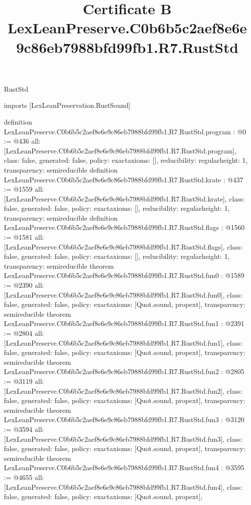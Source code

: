 \begin{lexlean}{RustStd}
\title{Certificate B LexLeanPreserve.C0b6b5c2aef8e6e9c86eb7988bfd99fb1.R7.RustStd}
\begin{coremodule}
imports [LexLeanPreservation.RustSound]

definition LexLeanPreserve.C0b6b5c2aef8e6e9c86eb7988bfd99fb1.R7.RustStd.program : @0 := @436 {
  all: [LexLeanPreserve.C0b6b5c2aef8e6e9c86eb7988bfd99fb1.R7.RustStd.program],
  class: false,
  generated: false,
  policy: exact{axioms: []},
  reducibility: regular{height: 1},
  transparency: semireducible
}
definition LexLeanPreserve.C0b6b5c2aef8e6e9c86eb7988bfd99fb1.R7.RustStd.krate : @437 := @1559 {
  all: [LexLeanPreserve.C0b6b5c2aef8e6e9c86eb7988bfd99fb1.R7.RustStd.krate],
  class: false,
  generated: false,
  policy: exact{axioms: []},
  reducibility: regular{height: 1},
  transparency: semireducible
}
definition LexLeanPreserve.C0b6b5c2aef8e6e9c86eb7988bfd99fb1.R7.RustStd.flags : @1560 := @1581 {
  all: [LexLeanPreserve.C0b6b5c2aef8e6e9c86eb7988bfd99fb1.R7.RustStd.flags],
  class: false,
  generated: false,
  policy: exact{axioms: []},
  reducibility: regular{height: 1},
  transparency: semireducible
}
theorem LexLeanPreserve.C0b6b5c2aef8e6e9c86eb7988bfd99fb1.R7.RustStd.fun0 : @1589 := @2390 {
  all: [LexLeanPreserve.C0b6b5c2aef8e6e9c86eb7988bfd99fb1.R7.RustStd.fun0],
  class: false,
  generated: false,
  policy: exact{axioms: [Quot.sound, propext]},
  transparency: semireducible
}
theorem LexLeanPreserve.C0b6b5c2aef8e6e9c86eb7988bfd99fb1.R7.RustStd.fun1 : @2391 := @2804 {
  all: [LexLeanPreserve.C0b6b5c2aef8e6e9c86eb7988bfd99fb1.R7.RustStd.fun1],
  class: false,
  generated: false,
  policy: exact{axioms: [Quot.sound, propext]},
  transparency: semireducible
}
theorem LexLeanPreserve.C0b6b5c2aef8e6e9c86eb7988bfd99fb1.R7.RustStd.fun2 : @2805 := @3119 {
  all: [LexLeanPreserve.C0b6b5c2aef8e6e9c86eb7988bfd99fb1.R7.RustStd.fun2],
  class: false,
  generated: false,
  policy: exact{axioms: [Quot.sound, propext]},
  transparency: semireducible
}
theorem LexLeanPreserve.C0b6b5c2aef8e6e9c86eb7988bfd99fb1.R7.RustStd.fun3 : @3120 := @3594 {
  all: [LexLeanPreserve.C0b6b5c2aef8e6e9c86eb7988bfd99fb1.R7.RustStd.fun3],
  class: false,
  generated: false,
  policy: exact{axioms: [Quot.sound, propext]},
  transparency: semireducible
}
theorem LexLeanPreserve.C0b6b5c2aef8e6e9c86eb7988bfd99fb1.R7.RustStd.fun4 : @3595 := @4655 {
  all: [LexLeanPreserve.C0b6b5c2aef8e6e9c86eb7988bfd99fb1.R7.RustStd.fun4],
  class: false,
  generated: false,
  policy: exact{axioms: [Quot.sound, propext]},
}
\end{coremodule}
\end{lexlean}
